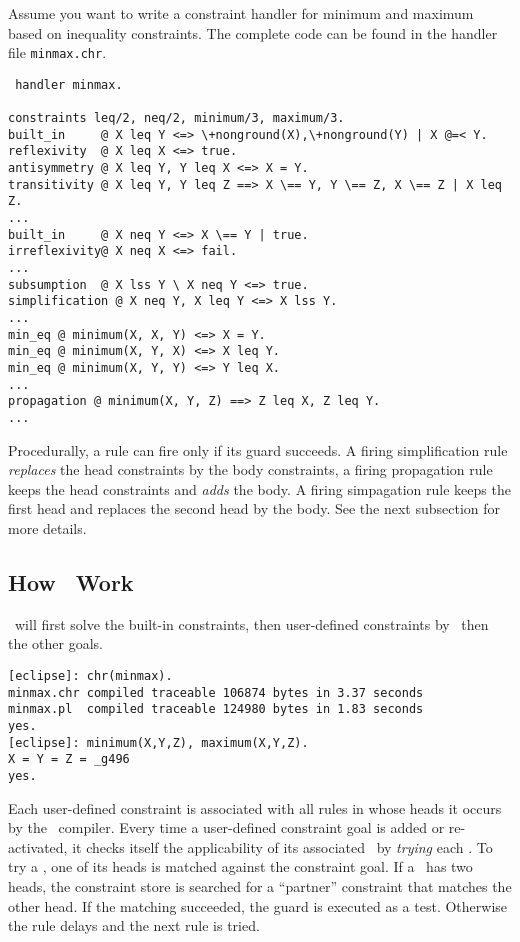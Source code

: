 Assume you want to write a constraint handler for minimum and maximum
based on inequality constraints.  The complete code can be found in
the handler file {\tt minmax.chr}. \begin{verbatim} handler minmax.

constraints leq/2, neq/2, minimum/3, maximum/3.
built_in     @ X leq Y <=> \+nonground(X),\+nonground(Y) | X @=< Y.
reflexivity  @ X leq X <=> true.
antisymmetry @ X leq Y, Y leq X <=> X = Y.
transitivity @ X leq Y, Y leq Z ==> X \== Y, Y \== Z, X \== Z | X leq Z.
...
built_in     @ X neq Y <=> X \== Y | true.
irreflexivity@ X neq X <=> fail. 
...
subsumption  @ X lss Y \ X neq Y <=> true.
simplification @ X neq Y, X leq Y <=> X lss Y. 
...
min_eq @ minimum(X, X, Y) <=> X = Y.
min_eq @ minimum(X, Y, X) <=> X leq Y.
min_eq @ minimum(X, Y, Y) <=> Y leq X.
...
propagation @ minimum(X, Y, Z) ==> Z leq X, Z leq Y.
...
\end{verbatim}

Procedurally, a rule can fire only if its guard succeeds.  A firing
simplification rule {\em replaces} the head constraints by the body
constraints, a firing propagation rule keeps the head constraints and
{\em adds} the body. A firing simpagation rule keeps the first head
and replaces the second head by the body. See the next subsection for
more details.


\subsection{How \chrs\ Work}

\eclipse\ will first solve the built-in constraints, 
then user-defined constraints by \chrs\, then the other goals.

 \begin{verbatim}
[eclipse]: chr(minmax).
minmax.chr compiled traceable 106874 bytes in 3.37 seconds
minmax.pl  compiled traceable 124980 bytes in 1.83 seconds
yes.
[eclipse]: minimum(X,Y,Z), maximum(X,Y,Z).
X = Y = Z = _g496
yes.
\end{verbatim}

Each user-defined constraint is associated with all rules in whose
heads it occurs by the \chr\ compiler. Every time a user-defined
constraint goal is added or re-activated, it checks itself the
applicability of its associated \chrs\ by {\em trying} each \chr.  To
try a \chr, one of its heads is matched against the constraint goal.
If a \chr\ has two heads, the constraint store is searched for a
``partner'' constraint that matches the other head.  If the matching
succeeded, the guard is executed as a test. Otherwise the rule delays
and the next rule is tried.

